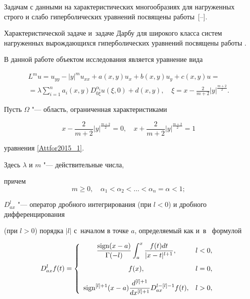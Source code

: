 Задачам с данными на характеристических многообразиях для нагруженных строго и слабо гиперболических уравнений посвящены работы~\mbox{[--].} 

Характеристической задаче и~задаче Дарбу для широкого класса систем нагруженных вырождающихся гиперболических уравнений посвящены работы \cite{litAtt08, litAtt09}.



В данной работе объектом исследования является уравнение вида

\begin{multline}

\label{Attfor2015_1}

L^m u=u_{yy}-|y|^m u_{xx}+a(x,y)u_x+b(x,y)u_y+c(x,y)u=

\\

=\lambda\sum\limits_{i=1}^n a_i (x,y) D_{0\xi}^{\alpha_i} u(\xi , 0)+d(x,y),

\quad \xi=x-\frac{2}{m+2}|y|^{\frac{m+2}{2}}.

\end{multline}



Пусть $\Omega$ "--- область, ограниченная характеристиками 

\begin{equation}

\label{Attfor2015_2}

x-\frac{2}{m+2}|y|^{\frac{m+2}{2}}=0, \quad x+\frac{2}{m+2}|y|^{\frac{m+2}{2}}=1

\end{equation}

уравнения \eqref{Attfor2015_1}. 

Здесь $\lambda$ и $m$ "--- действительные числа, 

причем $$m\geqslant 0,\quad \alpha_1<\alpha_2<\ldots<\alpha_n=\alpha<1;$$ 

$D_{a x}^l$  "--- оператор дробного интегрирования (при $l<0$) и дробного дифференцирования 

(при $l>0$) порядка $|l|$ с~началом в точке $a$, определяемый как и~в~\cite{Attfor2015_lit_01} формулой

\begin{equation}

D_{a x}^l f(t) = \left\{

\begin{array}{cl}

\displaystyle \frac{\mathop{\rm sign}(x-a)}{\Gamma(-l)}\int_a^x \frac{f(t)dt}{|x-t|^{l+1}}, 

& l<0,\\[5mm]

 f(x),                                                                   

& l=0,\\[3mm]

\displaystyle {\rm sign}^{[l]+1}(x-a)\frac{d^{[l]+1}}{dx^{[l]+1}} D_{a x}^{l-[l]-1} f(t),           

& l>0,

\end{array} \right.

\end{equation}

